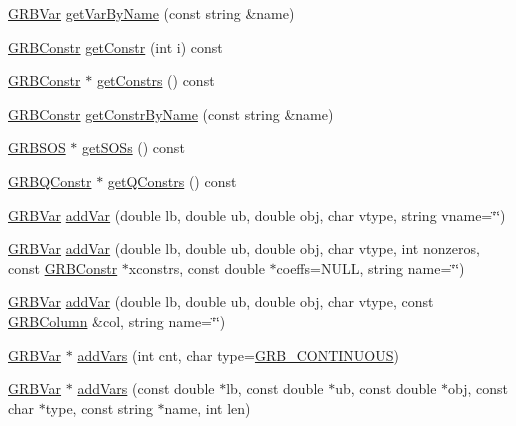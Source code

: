 \begin{DoxyCompactItemize}
\item 
\hyperlink{classGRBVar}{G\+R\+B\+Var} \hyperlink{classGRBModel_a98af5f146886bb892341df82c51e4dba}{get\+Var\+By\+Name} (const string \&name)
\item 
\hyperlink{classGRBConstr}{G\+R\+B\+Constr} \hyperlink{classGRBModel_a8505c2a2068a9dcfef060975840c5d7a}{get\+Constr} (int i) const 
\item 
\hyperlink{classGRBConstr}{G\+R\+B\+Constr} $\ast$ \hyperlink{classGRBModel_a0cf32507e437dfcd579c6ba865525281}{get\+Constrs} () const 
\item 
\hyperlink{classGRBConstr}{G\+R\+B\+Constr} \hyperlink{classGRBModel_a2d4b3c0b05bcfbd94e4e5537db318569}{get\+Constr\+By\+Name} (const string \&name)
\item 
\hyperlink{classGRBSOS}{G\+R\+B\+S\+OS} $\ast$ \hyperlink{classGRBModel_aff890e0663bd4e6ab03374924c7bbd94}{get\+S\+O\+Ss} () const 
\item 
\hyperlink{classGRBQConstr}{G\+R\+B\+Q\+Constr} $\ast$ \hyperlink{classGRBModel_a5feaa08937f3d4aad2fa1a84efc23cef}{get\+Q\+Constrs} () const 
\item 
\hyperlink{classGRBVar}{G\+R\+B\+Var} \hyperlink{classGRBModel_af31f99d256c700fa34ef0c9efdd76d98}{add\+Var} (double lb, double ub, double obj, char vtype, string vname=\char`\"{}\char`\"{})
\item 
\hyperlink{classGRBVar}{G\+R\+B\+Var} \hyperlink{classGRBModel_a99ff5e30497fae9e6b5d0e7fc67754d4}{add\+Var} (double lb, double ub, double obj, char vtype, int nonzeros, const \hyperlink{classGRBConstr}{G\+R\+B\+Constr} $\ast$xconstrs, const double $\ast$coeffs=N\+U\+LL, string name=\char`\"{}\char`\"{})
\item 
\hyperlink{classGRBVar}{G\+R\+B\+Var} \hyperlink{classGRBModel_aff71d21d540bc2938d4154022b22efb9}{add\+Var} (double lb, double ub, double obj, char vtype, const \hyperlink{classGRBColumn}{G\+R\+B\+Column} \&col, string name=\char`\"{}\char`\"{})
\item 
\hyperlink{classGRBVar}{G\+R\+B\+Var} $\ast$ \hyperlink{classGRBModel_ab66da570bb1582d82cfce21dfa2d4587}{add\+Vars} (int cnt, char type=\hyperlink{gurobi__c_8h_a6cc9be6c5a5942fae165ac67f0b55c09}{G\+R\+B\+\_\+\+C\+O\+N\+T\+I\+N\+U\+O\+US})
\item 
\hyperlink{classGRBVar}{G\+R\+B\+Var} $\ast$ \hyperlink{classGRBModel_aeae91a0fadbbfdc452a3d17ff5c68f6f}{add\+Vars} (const double $\ast$lb, const double $\ast$ub, const double $\ast$obj, const char $\ast$type, const string $\ast$name, int len)
\item 

\end{DoxyCompactItemize}
